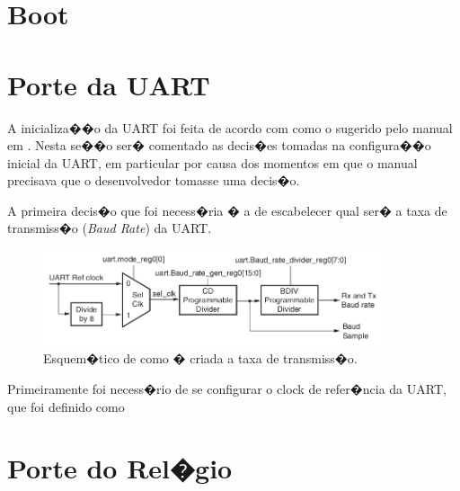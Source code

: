 \documentclass{ufscThesis/ufscThesis} %
\begin{document}
\section{Boot}
\section{Porte da UART}

A inicializa��o da UART foi feita de acordo com como o sugerido pelo manual em \cite[p.~554]{ug585}. Nesta se��o ser� comentado as decis�es tomadas na configura��o inicial da UART, em particular por causa dos momentos em que o manual precisava que o desenvolvedor tomasse uma decis�o.

A primeira decis�o que foi necess�ria � a de escabelecer qual ser� a taxa de transmiss�o (\emph{Baud Rate}) da UART. 

\begin{figure}[h!]
    \centering
    \includegraphics[width=10cm]{figuras/uart_board_rate}
    \caption{Esquem�tico de como � criada a taxa de transmiss�o.}
\end{figure}

Primeiramente foi necess�rio de se configurar o clock de refer�ncia da UART, que foi definido como 

\section{Porte do Rel�gio}









\end{document}
